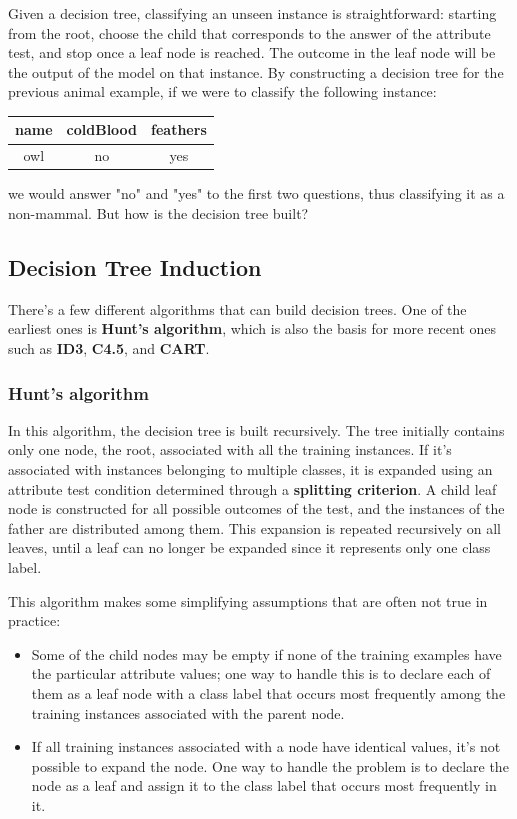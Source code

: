 Given a decision tree, classifying an unseen instance is straightforward: starting from the root, choose the child that corresponds to the answer of the attribute test, and stop once a leaf node is reached. The outcome in the leaf node will be the output of the model on that instance. By constructing a decision tree for the previous animal example, if we were to classify the following instance:
\begin{table}[h!]
    \centering
    \begin{tabular}{c|c|c}
        name & coldBlood & feathers \\
        \hline
        owl & no & yes \\
    \end{tabular}
\end{table}

we would answer "no" and "yes" to the first two questions, thus classifying it as a non-mammal. But how is the decision tree built?

\subsection{Decision Tree Induction}

There's a few different algorithms that can build decision trees. One of the earliest ones is \textbf{Hunt's algorithm}, which is also the basis for more recent ones such as \textbf{ID3}, \textbf{C4.5}, and \textbf{CART}.

\subsubsection{Hunt's algorithm}

In this algorithm, the decision tree is built recursively. The tree initially contains only one node, the root, associated with all the training instances. If it's associated with instances belonging to multiple classes, it is expanded using an attribute test condition determined through a \textbf{splitting criterion}. A child leaf node is constructed for all possible outcomes of the test, and the instances of the father are distributed among them. This expansion is repeated recursively on all leaves, until a leaf can no longer be expanded since it represents only one class label.

This algorithm makes some simplifying assumptions that are often not true in practice:
\begin{itemize}
    \item Some of the child nodes may be empty if none of the training examples have the particular attribute values; one way to handle this is to declare each of them as a leaf node with a class label that occurs most frequently among the training instances associated with the parent node.

    \item If all training instances associated with a node have identical values, it's not possible to expand the node. One way to handle the problem is to declare the node as a leaf and assign it to the class label that occurs most frequently in it.
\end{itemize}

